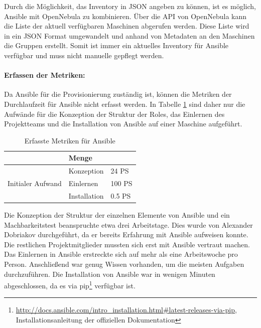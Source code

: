 Durch die Möglichkeit, das Inventory in JSON angeben zu können, ist es möglich, Ansible mit OpenNebula zu kombinieren. Über die API von OpenNebula kann die Liste der aktuell verfügbaren Maschinen abgerufen werden. Diese Liste wird in ein JSON Format umgewandelt und anhand von Metadaten an den Maschinen die Gruppen erstellt. Somit ist immer ein aktuelles Inventory für Ansible verfügbar und muss nicht manuelle gepflegt werden.

\paragraph{Erfassen der Metriken:}
Da Ansible für die Provisionierung zuständig ist, können die Metriken der Durchlaufzeit für Ansible nicht erfasst werden. In Tabelle \ref{tab:metric:ansible} sind daher nur die Aufwände für die Konzeption der Struktur der Roles, das Einlernen des Projektteams und die Installation von Ansible auf einer Maschine aufgeführt.

\begin{table}[ht]
\setlength{\tabcolsep}{5pt}
\renewcommand{\arraystretch}{1.5}
\centering
\begin{tabular}{|l|l|l|}
\hline
\rowcolor[HTML]{C0C0C0}
\multicolumn{2}{|c|}{\textbf{Metrik}} 				& \textbf{Menge}		\\ 
\hline
\multirow{3}{*}{Initialer Aufwand}	& Konzeption 	& 24 PS			\\ 
\cline{2-3}
									& Einlernen		& 100 PS			\\			\cline{2-3}
									& Installation 	& 0.5 PS 		\\
\hline
\end{tabular} 
\caption{Erfasste Metriken für Ansible}
\label{tab:metric:ansible}
\end{table}

Die Konzeption der Struktur der einzelnen Elemente von Ansible und ein Machbarkeitstest beanspruchte etwa drei Arbeitstage. Dies wurde von Alexander Dobriakov durchgeführt, da er bereits Erfahrung mit Ansible aufweisen konnte. Die restlichen Projektmitglieder mussten sich erst mit Ansible vertraut machen. Das Einlernen in Ansible erstreckte sich auf mehr als eine Arbeitswoche pro Person. Anschließend war genug Wissen vorhanden, um die meisten Aufgaben durchzuführen. Die Installation von Ansible war in wenigen Minuten abgeschlossen, da es via pip\footnote{\url{http://docs.ansible.com/intro_installation.html\#latest-releases-via-pip}, Installationsanleitung der offiziellen Dokumentation} verfügbar ist.

